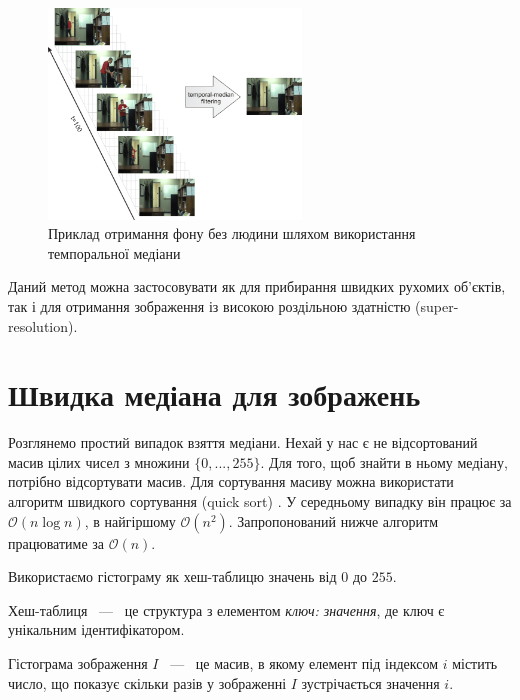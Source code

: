 \begin{figure}[H]
    \centering
    \includegraphics[width=0.6\textwidth]{images/temporal_median_example_1}
    \caption{Приклад отримання фону без людини шляхом використання темпоральної медіани
        \cite{temporal_median_example_1}
        \label{fig:temporal_median_example_1}
    }
\end{figure}
Даний метод можна застосовувати як для прибирання швидких рухомих об'єктів,
так і для  отримання зображення із високою роздільною здатністю (super-resolution).

\section{Швидка медіана для зображень}

Розглянемо простий випадок взяття медіани.
Нехай у нас є не відсортований масив цілих чисел з множини $\{0,..., 255\}$.
Для того, щоб знайти в ньому медіану, потрібно відсортувати масив.
Для сортування масиву можна використати алгоритм швидкого сортування (quick sort)
\cite{quick_sort}. У середньому випадку він працює за $\mathcal{O}(n\log{}n)$, в
найгіршому $\mathcal{O}(n^2)$.
Запропонований нижче алгоритм працюватиме за $\mathcal{O}(n)$.

Використаємо гістограму як хеш-таблицю  значень від $0$ до $255$.
\begin{definition}
    Хеш-таблиця ~---~ це структура з елементом \textit{{ключ: значення}}, де
    ключ є унікальним ідентифікатором.
\end{definition}

\begin{definition}
    Гістограма зображення $I$ ~---~ це масив, в якому елемент під індексом $i$ містить число, що показує скільки
    разів у зображенні $I$ зустрічається значення $i$.
\end{definition}

